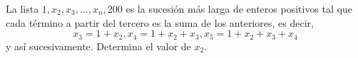 La lista $1, x_2, x_3, \dots , x_n, 200$ es la sucesión más larga de enteros positivos tal que cada término a partir del tercero es la suma de los anteriores, es decir,
\[x_3=1+x_2, x_4=1+x_2+x_3, x_5=1+x_2+x_3+x_4\]
y así sucesivamente. Determina el valor de $x_2$.
